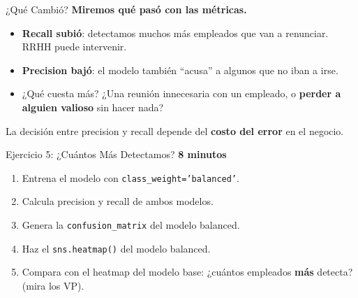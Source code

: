 \documentclass[aspectratio=169, 11pt]{beamer}
\begin{document}
\begin{frame}{¿Qué Cambió?}
  \vspace{-4pt}
  {\footnotesize\color{arcaDark}\bfseries
    Miremos qué pasó con las métricas.}

  \vspace{8pt}
  {\footnotesize
  \begin{itemize}\setlength{\itemsep}{6pt}
    \item[{\color{codeGreen}\scriptsize\faCheckCircle}]
      \textbf{Recall subió}: detectamos muchos más empleados
      que van a renunciar. RRHH puede intervenir.
    \item[{\color{codeOrange}\scriptsize\faExclamationTriangle}]
      \textbf{Precision bajó}: el modelo también ``acusa''
      a algunos que no iban a irse.
    \item[{\color{arcaRed}\scriptsize\faArrowRight}]
      ¿Qué cuesta más? ¿Una reunión innecesaria con un empleado,
      o \textbf{perder a alguien valioso} sin hacer nada?
  \end{itemize}
  }

  \vspace{6pt}
  {\footnotesize\color{arcaDark}
    \faLightbulb\hspace{4pt}
    La decisión entre precision y recall depende del
    \textbf{costo del error} en el negocio.}
\end{frame}

\begin{frame}[shrink=5]{Ejercicio 5: ¿Cuántos Más Detectamos?}
  \vspace{-4pt}
  {\footnotesize\color{arcaDark}\bfseries
    \faClock\hspace{4pt} 8 minutos}

  \vspace{6pt}
  {\footnotesize
  \begin{enumerate}\setlength{\itemsep}{5pt}
    \item Entrena el modelo con \texttt{class\_weight='balanced'}.
    \item Calcula precision y recall de ambos modelos.
    \item Genera la \texttt{confusion\_matrix} del modelo balanced.
    \item Haz el \texttt{sns.heatmap()} del modelo balanced.
    \item Compara con el heatmap del modelo base:
      ¿cuántos empleados \textbf{más} detecta? (mira los VP).
  \end{enumerate}
  }
\end{frame}
\end{document}
